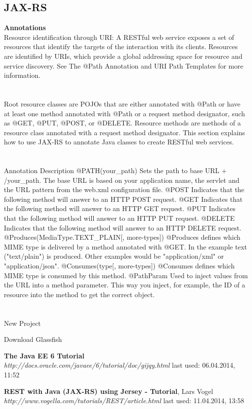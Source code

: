 \documentclass[12pt]{article}
\begin{document}
\subsection{JAX-RS}
\textbf{Annotations}\\
Resource identification through URI: A RESTful web service exposes a set of resources that identify the targets of the interaction with its clients. Resources are identified by URIs, which provide a global addressing space for resource and service discovery. See The @Path Annotation and URI Path Templates for more information.
\\ \\ \\
Root resource classes are POJOs that are either annotated with @Path or have at least one method annotated with @Path or a request method designator, such as @GET, @PUT, @POST, or @DELETE. Resource methods are methods of a resource class annotated with a request method designator. This section explains how to use JAX-RS to annotate Java classes to create RESTful web services.\cite{javaEE6}
\\ \\ \\
Annotation	Description
@PATH(your_path)	Sets the path to base URL + /your_path. The base URL is based on your application name, the servlet and the URL pattern from the web.xml configuration file.
@POST	Indicates that the following method will answer to an HTTP POST request.
@GET	Indicates that the following method will answer to an HTTP GET request.
@PUT	Indicates that the following method will answer to an HTTP PUT request.
@DELETE	Indicates that the following method will answer to an HTTP DELETE request.
@Produces(MediaType.TEXT_PLAIN[, more-types])	@Produces defines which MIME type is delivered by a method annotated with @GET. In the example text ("text/plain") is produced. Other examples would be "application/xml" or "application/json".
@Consumes(type[, more-types])	@Consumes defines which MIME type is consumed by this method.
@PathParam	Used to inject values from the URL into a method parameter. This way you inject, for example, the ID of a resource into the method to get the correct object.
\\ \\ \\




New Project

Download Glassfish




\newpage
\begin{thebibliography}{56}

   \textbf{The Java EE 6 Tutorial} \\
  \textit{http://docs.oracle.com/javaee/6/tutorial/doc/gijqy.html}
  \newline last used: 06.04.2014, 11:52
  
   \textbf{REST with Java (JAX-RS) using Jersey - Tutorial}, Lars Vogel\\
  \textit{  http://www.vogella.com/tutorials/REST/article.html}
  \newline last used: 11.04.2014, 13:58
\end{thebibliography}
\end{document}
